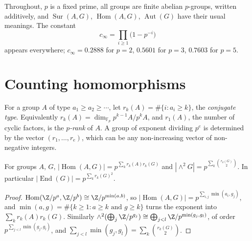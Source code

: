 Throughout, $p$ is a fixed prime, all groups are finite abelian $p$-groups, written additively, and $\operatorname{Sur}(A,G)$, $\operatorname{Hom}(A,G)$, $\operatorname{Aut}(G)$ have their usual meanings. The constant
\[
c_\infty=\prod_{i\ge1}\bigl(1-p^{-i}\bigr)
\]
appears everywhere; $c_\infty=0.2888$ for $p=2$, $0.5601$ for $p=3$, $0.7603$ for $p=5$.

\section{Counting homomorphisms}

For a group $A$ of type $a_1\ge a_2\ge\cdots$, let $r_k(A)=\#\{i:a_i\ge k\}$, the \emph{conjugate type}. Equivalently $r_k(A)=\dim_{\mathbb F_p}p^{k-1}A/p^kA$, and $r_1(A)$, the number of cyclic factors, is the \emph{$p$-rank} of $A$. A group of exponent dividing $p^e$ is determined by the vector $(r_1,\dots,r_e)$, which can be any non-increasing vector of non-negative integers.

\begin{lemma}\label{lem:homcount}
For groups $A$, $G$, $|\operatorname{Hom}(A,G)|=p^{\sum_kr_k(A)r_k(G)}$ and $|\wedge^2G|=p^{\sum_k\binom{r_k(G)}2}$. In particular $|\operatorname{End}(G)|=p^{\sum_kr_k(G)^2}$.
\end{lemma}
\begin{proof}
$\operatorname{Hom}(\Z/p^a,\Z/p^b)\cong\Z/p^{\min(a,b)}$, so $|\operatorname{Hom}(A,G)|=p^{\sum_{i,j}\min(a_i,g_j)}$, and $\min(a,g)=\#\{k\ge1:a\ge k\text{ and }g\ge k\}$ turns the exponent into $\sum_kr_k(A)r_k(G)$. Similarly $\wedge^2(\bigoplus_j\Z/p^{g_j})\cong\bigoplus_{j<l}\Z/p^{\min(g_j,g_l)}$, of order $p^{\sum_{j<l}\min(g_j,g_l)}$, and $\sum_{j<l}\min(g_j,g_l)=\sum_k\binom{r_k(G)}2$.
\end{proof}

